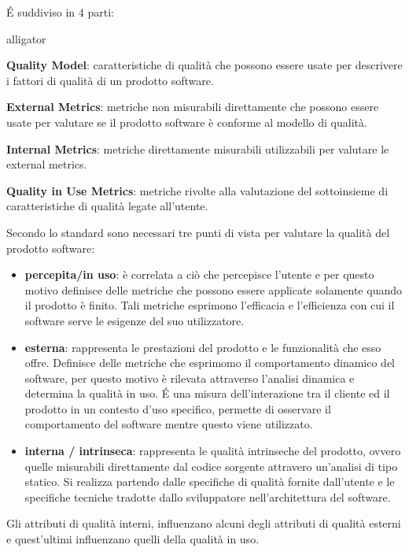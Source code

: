 É suddiviso in 4 parti:
\begin{labeling}{alligator}
	\item \textbf{Quality Model}: caratteristiche di qualità che possono essere usate per descrivere i fattori di qualità di un prodotto software.
	\item \textbf{External Metrics}: metriche non misurabili direttamente che possono essere usate per valutare se il prodotto software è conforme al modello di qualità.
	\item \textbf{Internal Metrics}: metriche direttamente misurabili utilizzabili per valutare le external metrics.
	\item \textbf{Quality in Use Metrics}: metriche rivolte alla valutazione del sottoinsieme di caratteristiche di qualità legate all’utente.
\end{labeling}

Secondo lo standard sono necessari tre punti di vista per valutare la qualità del prodotto software:
\begin{itemize}
	\item \textbf{percepita/in uso}: è correlata a ciò che percepisce l'utente e per questo motivo definisce delle metriche che possono essere applicate solamente quando il prodotto è finito. Tali metriche esprimono l'efficacia e l'efficienza con cui il software serve le esigenze del suo utilizzatore. 
	 
	\item \textbf{esterna}: rappresenta le prestazioni del prodotto e le funzionalità che esso offre. Definisce delle metriche che esprimomo il comportamento dinamico del software, per questo motivo è rilevata attraverso l'analisi dinamica e determina la qualità in uso. É una misura dell'interazione tra il cliente ed il prodotto in un contesto d'uso specifico, permette di osservare il comportamento del software mentre questo viene utilizzato. 
	
	\item \textbf{interna / intrinseca}: rappresenta le qualità intrinseche del prodotto, ovvero quelle misurabili direttamente dal codice sorgente attravero un'analisi di tipo statico. Si realizza partendo dalle specifiche di qualità fornite dall'utente e le specifiche tecniche tradotte dallo sviluppatore nell'architettura del software.
\end{itemize}

Gli attributi di qualità interni, influenzano alcuni degli attributi di qualità esterni e quest'ultimi influenzano quelli della qualità in uso.

